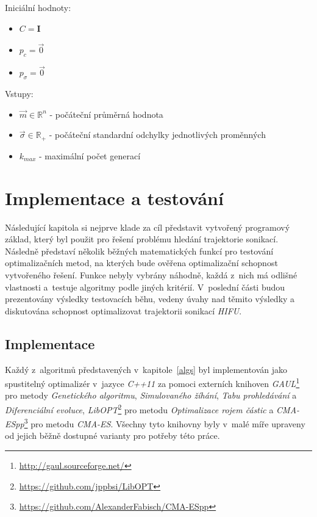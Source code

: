 \hfill
\noindent
\begin{minipage}[t]{.32\textwidth}

Iniciální hodnoty:
\begin{itemize}
    \item $C = \textbf{I}$ 
    \item $p_c = \Vec{0}$
    \item $p_{\sigma} = \Vec{0}$
\end{itemize}
\end{minipage}
\begin{minipage}[t]{.32\textwidth}

Vstupy:
\begin{itemize}
    
    \item $\Vec{m} \in \mathbb{R}^n$ - počáteční průměrná hodnota 
    \item $\Vec{\sigma} \in \mathbb{R}_+$ - počáteční standardní odchylky jednotlivých proměnných
    \item $k_{max}$ - maximální počet generací
\end{itemize}
\end{minipage}

\chapter{Implementace a testování}
\label{impl}
Následující kapitola si nejprve klade za cíl představit vytvořený programový základ, který byl použit pro řešení problému hledání trajektorie sonikací. Následně představí několik běžných matematických funkcí pro testování optimalizačních metod, na kterých bude ověřena optimalizační schopnost vytvořeného řešení. Funkce nebyly vybrány náhodně, každá z~nich má odlišné vlastnosti a~testuje algoritmy podle jiných kritérií. V~poslední části budou prezentovány výsledky testovacích běhu, vedeny úvahy nad těmito výsledky a diskutována schopnost optimalizovat trajektorii sonikací \emph{HIFU}.
\section{Implementace}
Každý z~algoritmů představených v~kapitole~\ref{algs} byl implementován jako spustitelný optimalizér v~jazyce \emph{C++11} za pomoci externích knihoven \emph{GAUL}\footnote{\url{http://gaul.sourceforge.net/}} pro metody \emph{Genetického algoritmu}, \emph{Simulovaného žíhání}, \emph{Tabu prohledávání} a \emph{Diferenciální evoluce}, \emph{LibOPT}\footnote{\url{https://github.com/jppbsi/LibOPT}} pro metodu \emph{Optimalizace rojem částic} a \emph{CMA-ESpp}\footnote{\url{https://github.com/AlexanderFabisch/CMA-ESpp}} pro metodu \emph{CMA-ES}. Všechny tyto knihovny byly v~malé míře upraveny od jejich běžně dostupné varianty pro potřeby této práce. 

